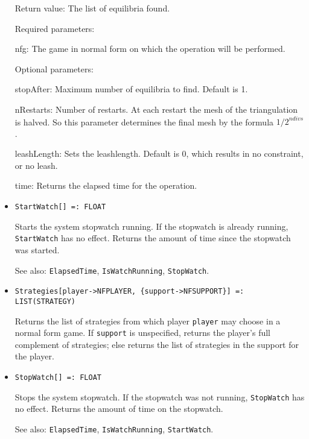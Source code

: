 \begin{itemize}
\item
[Return value:] The list of equilibria found.
\item
[Required parameters:]\hfil\null

\bd
\item
[nfg:] The game in normal form on which the operation will be
performed.
\ed

\item
[Optional parameters:]\hfil\null
	
\bd
\item
[stopAfter:] Maximum number of equilibria to find. Default is 1.  
\item 
[nRestarts:] Number of restarts.  At each restart the mesh of the
triangulation is halved.  So this parameter determines the final mesh
by the formula ${1/2}^{ndivs}$.
\item
[leashLength:] Sets the leashlength. Default is 0, which results in no
constraint, or no leash.  
\item
[time:] Returns the elapsed time for the operation.
\ed
\ed

\item
\protect \large \begin{verbatim}
StartWatch[] =: FLOAT
\end{verbatim}\normalsize

\bd
Starts the system stopwatch running.  If the stopwatch
is already running, {\tt StartWatch} has no effect.  Returns the amount
of time since the stopwatch was started.
\item
[See also:] {\tt ElapsedTime}, {\tt IsWatchRunning}, {\tt StopWatch}.
\ed

\item
\protect \large \begin{verbatim}
Strategies[player->NFPLAYER, {support->NFSUPPORT}] =: LIST(STRATEGY)
\end{verbatim}\normalsize

\bd
Returns the list of strategies from which player \verb+player+ may choose
in a normal form game.  If \verb+support+ is unspecified, returns the
player's full complement of strategies; else returns the list of strategies
in the support for the player.
\ed

\item
\protect \large \begin{verbatim}
StopWatch[] =: FLOAT
\end{verbatim}\normalsize

\bd
Stops the system stopwatch.  If the stopwatch was not
running, {\tt StopWatch} has no effect.  Returns the amount of time
on the stopwatch.
\item
[See also:] {\tt ElapsedTime}, {\tt IsWatchRunning}, {\tt StartWatch}.
\ed


\end{itemize}
